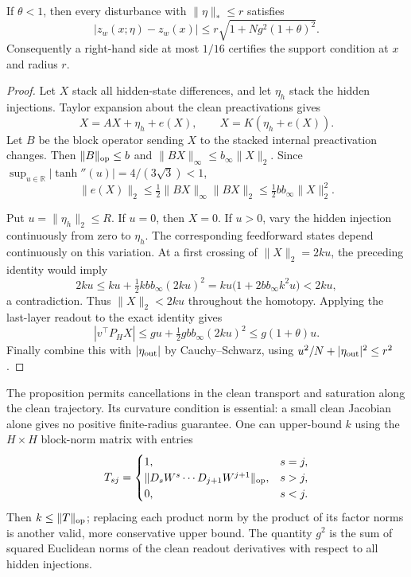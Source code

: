 \begin{proposition}
\label{prop:standalone-jacobian-curvature}
If $\theta<1$, then every disturbance with $\|\eta\|_*\le r$ satisfies
\begin{equation}\label{eq:standalone-jacobian-bound}
 |z_w(x;\eta)-z_w(x)|
 \le r\sqrt{1+Ng^2(1+\theta)^2}.
\end{equation}
Consequently a right-hand side at most $1/16$ certifies the support
condition at $x$ and radius $r$.
\end{proposition}

\begin{proof}
Let $X$ stack all hidden-state differences, and let $\eta_h$ stack the
hidden injections. Taylor expansion about the clean preactivations gives
\[
 X=AX+\eta_h+e(X),\qquad X=K(\eta_h+e(X)).
\]
Let $B$ be the block operator sending $X$ to the stacked internal
preactivation changes. Then $\|B\|_{\rm op}\le b$ and
$\|BX\|_\infty\le b_\infty\|X\|_2$. Since
$\sup_{u\in\mathbb R}|\tanh''(u)|=4/(3\sqrt3)<1$,
\begin{equation}\label{eq:standalone-curvature-remainder}
 \|e(X)\|_2
 \le\tfrac12\|BX\|_\infty\|BX\|_2
 \le\tfrac12bb_\infty\|X\|_2^2.
\end{equation}

Put $u=\|\eta_h\|_2\le R$. If $u=0$, then $X=0$.
If $u>0$, vary the hidden injection continuously from zero to
$\eta_h$. The corresponding feedforward states depend continuously
on this variation. At a first crossing of $\|X\|_2=2ku$, the preceding
identity would imply
\[
 2ku\le ku+\tfrac12kbb_\infty(2ku)^2
       =ku\bigl(1+2bb_\infty k^2u\bigr)<2ku,
\]
a contradiction. Thus $\|X\|_2<2ku$ throughout the homotopy.
Applying the last-layer readout to the exact identity gives
\[
 |v^\top P_HX|
 \le gu+\tfrac12gbb_\infty(2ku)^2
 \le g(1+\theta)u.
\]
Finally combine this with $|\eta_{\rm out}|$ by Cauchy--Schwarz,
using $u^2/N+|\eta_{\rm out}|^2\le r^2$.
\end{proof}

The proposition permits cancellations in the clean transport and
saturation along the clean trajectory. Its curvature condition is
essential: a small clean Jacobian alone gives no positive finite-radius
guarantee. One can upper-bound $k$ using the $H\times H$ block-norm
matrix with entries
\[
 T_{sj}=\begin{cases}
 1,&s=j,\\
 \|D_sW^s\cdots D_{j+1}W^{j+1}\|_{\rm op},&s>j,\\
 0,&s<j.
 \end{cases}
\]
Then $k\le\|T\|_{\rm op}$; replacing each product norm by the product
of its factor norms is another valid, more conservative upper bound.
The quantity $g^2$ is the sum of squared Euclidean norms of the clean
readout derivatives with respect to all hidden injections.

